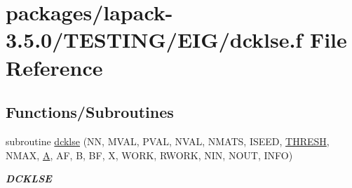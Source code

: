 \hypertarget{dcklse_8f}{}\section{packages/lapack-\/3.5.0/\+T\+E\+S\+T\+I\+N\+G/\+E\+I\+G/dcklse.f File Reference}
\label{dcklse_8f}
\subsection*{Functions/\+Subroutines}
\begin{DoxyCompactItemize}
\item 
subroutine \hyperlink{group__double__eig_ga4d9cfcdec43b543507c9b770e2d4e0e3}{dcklse} (N\+N, M\+V\+A\+L, P\+V\+A\+L, N\+V\+A\+L, N\+M\+A\+T\+S, I\+S\+E\+E\+D, \hyperlink{zlaqgs_8c_a0656018abfc9fa2821827415f5d5ea57}{T\+H\+R\+E\+S\+H}, N\+M\+A\+X, \hyperlink{classA}{A}, A\+F, B, B\+F, X, W\+O\+R\+K, R\+W\+O\+R\+K, N\+I\+N, N\+O\+U\+T, I\+N\+F\+O)
\begin{DoxyCompactList}\small\item\em {\bfseries D\+C\+K\+L\+S\+E} \end{DoxyCompactList}\end{DoxyCompactItemize}
